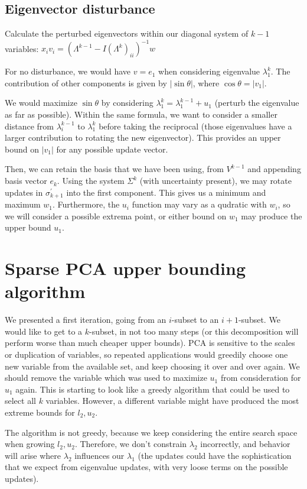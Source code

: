 \documentclass{article}
\begin{document}
\subsection{Eigenvector disturbance}

Calculate the perturbed eigenvectors within our diagonal system of $k-1$ variables: $x_i v_i = (\Lambda^{k-1} - I(\Lambda^k)_{ii})^{-1} w$

For no disturbance, we would have $v = e_1$ when considering eigenvalue $\lambda_1^k$. The contribution of other components is given by $|\sin\theta|$, where $\cos\theta = |v_1|$.

We would maximize $\sin\theta$ by considering $\lambda_1^k = \lambda_1^{k-1} + u_1$ (perturb the eigenvalue as far as possible). Within the same formula, we want to consider a smaller distance from $\lambda_i^{k-1}$ to $\lambda_1^k$ before taking the reciprocal (those eigenvalues have a larger contribution to rotating the new eigenvector). This provides an upper bound on $|v_1|$ for any possible update vector.

Then, we can retain the basis that we have been using, from $V^{k-1}$ and appending basis vector $e_k$. Using the system $\Sigma^k$ (with uncertainty present), we may rotate updates in $\sigma_{k+1}^\prime$ into the first component. This gives us a minimum and maximum $w_1$. Furthermore, the $u_i$ function may vary as a qudratic with $w_i$, so we will consider a possible extrema point, or either bound on $w_1$ may produce the upper bound $u_1$.

\section{Sparse PCA upper bounding algorithm}

We presented a first iteration, going from an $i$-subset to an $i+1$-subset. We would like to get to a $k$-subset, in not too many steps (or this decomposition will perform worse than much cheaper upper bounds). PCA is sensitive to the scales or duplication of variables, so repeated applications would greedily choose one new variable from the available set, and keep choosing it over and over again. We should remove the variable which was used to maximize $u_1$ from consideration for $u_1$ again. This is starting to look like a greedy algorithm that could be used to select all $k$ variables. However, a different variable might have produced the most extreme bounds for $l_2,u_2$.

The algorithm is not greedy, because we keep considering the entire search space when growing $l_2,u_2$. Therefore, we don't constrain $\lambda_2$ incorrectly, and behavior will arise where $\lambda_2$ influences our $\lambda_1$ (the updates could have the sophistication that we expect from eigenvalue updates, with very loose terms on the possible updates).
\end{document}
